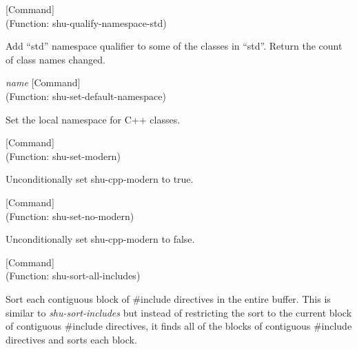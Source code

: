 \vspace{1em}
\noindent
{}
\usebox{\funcname}
 \hfill [Command]\\%
 (Function: shu-qualify-namespace-std)

\begin{doc-string}
Add ``std'' namespace qualifier to some of the classes in ``std''.  Return the
count of class names changed.
\end{doc-string}

\vspace{1em}
\noindent
{}
\usebox{\funcname}\emph{name}
 \hfill [Command]\\%
 (Function: shu-set-default-namespace)

\begin{doc-string}
Set the local namespace for C++ classes.
\end{doc-string}

\vspace{1em}
\noindent
{}
\usebox{\funcname}
 \hfill [Command]\\%
 (Function: shu-set-modern)

\begin{doc-string}
Unconditionally set shu-cpp-modern to true.
\end{doc-string}

\vspace{1em}
\noindent
{}
\usebox{\funcname}
 \hfill [Command]\\%
 (Function: shu-set-no-modern)

\begin{doc-string}
Unconditionally set shu-cpp-modern to false.
\end{doc-string}

\vspace{1em}
\noindent
{}
\usebox{\funcname}
 \hfill [Command]\\%
 (Function: shu-sort-all-includes)

\begin{doc-string}
Sort each contiguous block of \#include directives in the entire buffer.  This
is similar to \emph{shu-sort-includes} but instead of restricting the sort to the
current block of contiguous \#include directives, it finds all of the blocks of
contiguous \#include directives and sorts each block.
\end{doc-string}

